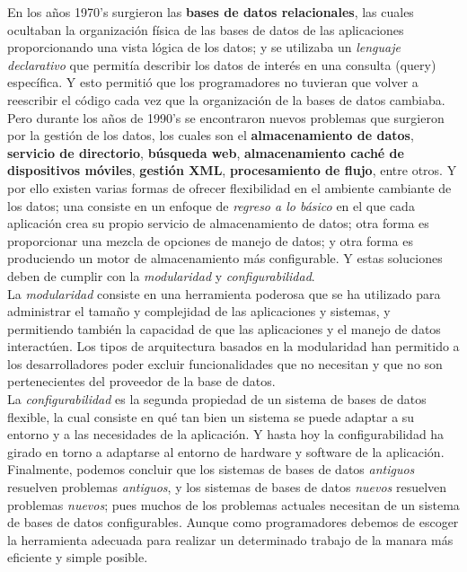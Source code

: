 \documentclass[12pt]{article}
\begin{document}
En los años 1970's surgieron las \textbf{bases de datos relacionales}, las cuales ocultaban la organización física de las bases de datos de las aplicaciones proporcionando una vista lógica de los datos; y se utilizaba un \textit{lenguaje declarativo} que permitía describir los datos de interés en una consulta (query) específica. Y esto permitió que los programadores no tuvieran que volver a reescribir el código cada vez que la organización de la bases de datos cambiaba.\\
Pero durante los años de 1990's se encontraron nuevos problemas que surgieron por la gestión de los datos, los cuales son el \textbf{almacenamiento de datos}, \textbf{servicio de directorio}, \textbf{búsqueda web}, \textbf{almacenamiento caché de dispositivos móviles}, \textbf{gestión XML}, \textbf{procesamiento de flujo}, entre otros. Y por ello existen varias formas de ofrecer flexibilidad en el ambiente cambiante de los datos; una consiste en un enfoque de \textit{regreso a lo básico} en el que cada aplicación crea su propio servicio de almacenamiento de datos; otra forma es proporcionar una mezcla de opciones de manejo de datos; y otra forma es produciendo un motor de almacenamiento más configurable. Y estas soluciones deben de cumplir con la \textit{modularidad} y \textit{configurabilidad}.\\

La \textit{modularidad} consiste en una herramienta poderosa que se ha utilizado para administrar el tamaño y complejidad de las aplicaciones y sistemas, y permitiendo también la capacidad de que las aplicaciones y el manejo de datos interactúen. Los tipos de arquitectura basados en la modularidad han permitido a los desarrolladores poder excluir funcionalidades que no necesitan y que no son pertenecientes del proveedor de la base de datos.\\

La \textit{configurabilidad} es la segunda propiedad de un sistema de bases de datos flexible, la cual consiste en qué tan bien un sistema se puede adaptar a su entorno y a las necesidades de la aplicación. Y hasta hoy la configurabilidad ha girado en torno a adaptarse al entorno de hardware y software de la aplicación.\\

Finalmente, podemos concluir que los sistemas de bases de datos \textit{antiguos} resuelven problemas \textit{antiguos}, y los sistemas de bases de datos \textit{nuevos} resuelven problemas \textit{nuevos}; pues muchos de los problemas actuales necesitan de un sistema de bases de datos configurables. Aunque como programadores debemos de escoger la herramienta adecuada para realizar un determinado trabajo de la manara más eficiente y simple posible.
\end{document}
